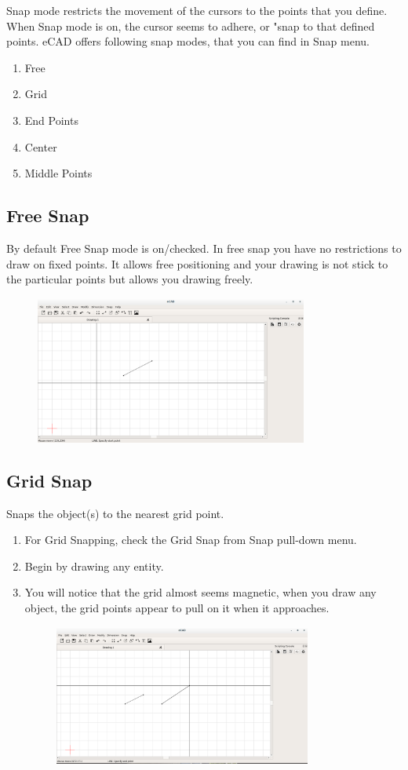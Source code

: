 Snap mode restricts the movement of the cursors to the points that you define. When Snap mode is on, the cursor seems to adhere, or "snap to that defined points. eCAD offers following snap modes, that you can find in Snap menu.
\begin{enumerate}
\item Free
\item Grid
\item End Points
\item Center
\item Middle Points
\end{enumerate}
\subsection{Free Snap}
By default Free Snap mode is on/checked. In free snap you have no restrictions to draw on fixed points. It allows free positioning and your drawing is not stick to the particular points but allows you drawing freely.
\begin{figure}[h!]
\centering
\includegraphics[width=0.8\textwidth]{images/fsnap.png}
\end{figure}
\subsection{Grid Snap}
Snaps the object(s) to the nearest grid point.
\begin{enumerate}
\item For Grid Snapping, check the Grid Snap from Snap pull-down menu.
\item Begin by drawing any entity.
\item You will notice that the grid almost seems magnetic, when you draw any object, the grid points appear to pull on it when it approaches.
\begin{figure}[h!]
\centering
\includegraphics[width=0.8\textwidth]{images/gsnap.png}
\end{figure}
\end{enumerate}
